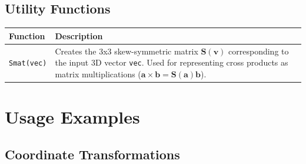 \documentclass[
  letterpaper,
  DIV=11,
  numbers=noendperiod]{scrreprt}
\begin{document}
\subsection*{Utility Functions}\label{utility-functions}

\begin{longtable}[]{@{}
  >{\raggedright\arraybackslash}p{}
  >{\raggedright\arraybackslash}p{}@{}}
\toprule\noalign{}
\begin{minipage}[b]{\linewidth}\raggedright
Function
\end{minipage} & \begin{minipage}[b]{\linewidth}\raggedright
Description
\end{minipage} \\
\midrule\noalign{}
\endhead
\bottomrule\noalign{}
\endlastfoot
\texttt{Smat(vec)} & Creates the 3x3 skew-symmetric matrix
\(\mathbf{S}(\mathbf{v})\) corresponding to the input 3D vector
\texttt{vec}. Used for representing cross products as matrix
multiplications
(\(\mathbf{a} \times \mathbf{b} = \mathbf{S}(\mathbf{a}) \mathbf{b}\)). \\
\end{longtable}

\section*{Usage Examples}\label{usage-examples}


\subsection*{Coordinate
Transformations}\label{coordinate-transformations}
\end{document}
